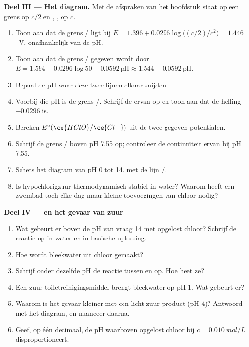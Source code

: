 \begin{problem}
\medskip
\noindent\textbf{Deel III --- Het diagram.}
Met de afspraken van het hoofdstuk staat  op een grens op
$c/2$ en , ,  op $c$.
\begin{enumerate}[resume]
  \item Toon aan dat de grens / ligt bij $E = 1.396 +
        0.0296\log\bigl((c/2)/c^2\bigr) = 1.446$~V, onafhankelijk van de
        pH.
  \item Toon aan dat de grens / gegeven wordt door $E = 1.594 -
        0.0296\log 50 - 0.0592\,\mathrm{pH} \approx 1.544 -
        0.0592\,\mathrm{pH}$.
  \item Bepaal de pH waar deze twee lijnen elkaar snijden.
  \item Voorbij die pH is de grens /. Schrijf de
         ervan op en toon aan dat de helling $-0.0296$ is.
  \item Bereken $E^\circ(\ce{HClO}/\ce{Cl-})$ uit de twee gegeven
        potentialen.
  \item Schrijf de grens / boven pH 7.55 op; controleer
        de continuïteit ervan bij pH 7.55.
  \item Schets het diagram van pH 0 tot 14, met de lijn /.
  \item Is hypochlorigzuur thermodynamisch stabiel in water? Waarom heeft
        een zwembad toch elke dag maar kleine toevoegingen van chloor
        nodig?
\end{enumerate}

\medskip
\noindent\textbf{Deel IV ---  en het gevaar van zuur.}
\begin{enumerate}[resume]
  \item Wat gebeurt er boven de pH van vraag 14 met opgelost chloor?
        Schrijf de reactie op in water en in basische oplossing.
  \item Hoe wordt bleekwater uit chloor gemaakt?
  \item Schrijf onder dezelfde pH de reactie tussen  en 
        op. Hoe heet ze?
  \item Een zuur toiletreinigingsmiddel brengt bleekwater op pH 1. Wat
        gebeurt er?
  \item Waarom is het gevaar kleiner met een licht zuur product (pH 4)?
        Antwoord met het diagram, en nuanceer daarna.
  \item Geef, op één decimaal, de pH waarboven opgelost chloor bij
        $c = \qty{0.010}{mol/L}$ disproportioneert.
\end{enumerate}
\end{problem}
